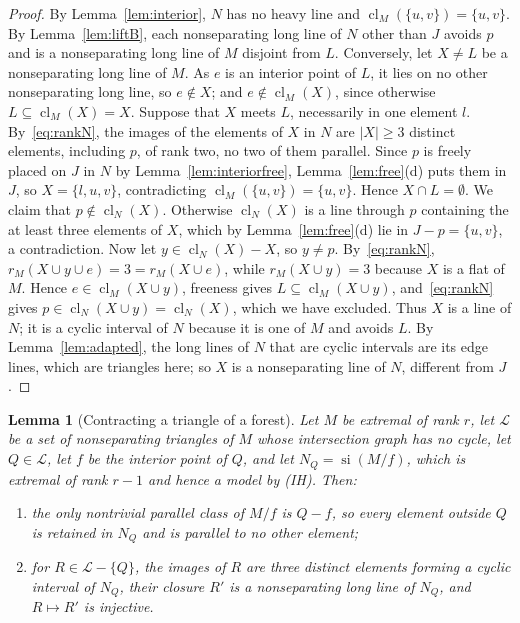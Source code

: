 \documentclass[11pt]{amsart}
\newtheorem{lemma}[theorem]{Lemma}
\theoremstyle{definition}
\theoremstyle{remark}
\numberwithin{equation}{section}
\newcommand{\cl}{\operatorname{cl}}
\newcommand{\si}{\operatorname{si}}
\begin{document}
\begin{proof}
By Lemma~\ref{lem:interior}, $N$ has no heavy line and $\cl_M(\{u,v\})=\{u,v\}$. By Lemma~\ref{lem:liftB}, each nonseparating long line of $N$ other than $J$ avoids $p$ and is a nonseparating long line of $M$ disjoint from $L$. Conversely, let $X\ne L$ be a nonseparating long line of $M$. As $e$ is an interior point of $L$, it lies on no other nonseparating long line, so $e\notin X$; and $e\notin\cl_M(X)$, since otherwise $L\subseteq\cl_M(X)=X$. Suppose that $X$ meets $L$, necessarily in one element $l$. By~\eqref{eq:rankN}, the images of the elements of $X$ in $N$ are $|X|\ge3$ distinct elements, including $p$, of rank two, no two of them parallel. Since $p$ is freely placed on $J$ in $N$ by Lemma~\ref{lem:interiorfree}, Lemma~\ref{lem:free}(d) puts them in $J$, so $X=\{l,u,v\}$, contradicting $\cl_M(\{u,v\})=\{u,v\}$. Hence $X\cap L=\emptyset$. We claim that $p\notin\cl_N(X)$. Otherwise $\cl_N(X)$ is a line through $p$ containing the at least three elements of $X$, which by Lemma~\ref{lem:free}(d) lie in $J-p=\{u,v\}$, a contradiction. Now let $y\in\cl_N(X)-X$, so $y\ne p$. By~\eqref{eq:rankN}, $r_M(X\cup y\cup e)=3=r_M(X\cup e)$, while $r_M(X\cup y)=3$ because $X$ is a flat of $M$. Hence $e\in\cl_M(X\cup y)$, freeness gives $L\subseteq\cl_M(X\cup y)$, and~\eqref{eq:rankN} gives $p\in\cl_N(X\cup y)=\cl_N(X)$, which we have excluded. Thus $X$ is a line of $N$; it is a cyclic interval of $N$ because it is one of $M$ and avoids $L$. By Lemma~\ref{lem:adapted}, the long lines of $N$ that are cyclic intervals are its edge lines, which are triangles here; so $X$ is a nonseparating line of $N$, different from $J$.
\end{proof}

\begin{lemma}[Contracting a triangle of a forest]\label{lem:persist}
Let $M$ be extremal of rank $r$, let $\mathcal L$ be a set of nonseparating triangles of $M$ whose intersection graph has no cycle, let $Q\in\mathcal L$, let $f$ be the interior point of $Q$, and let $N_Q=\si(M/f)$, which is extremal of rank $r-1$ and hence a model by \textup{(IH)}. Then:
\begin{enumerate}[label=\textup{(\alph*)}]
\item the only nontrivial parallel class of $M/f$ is $Q-f$, so every element outside $Q$ is retained in $N_Q$ and is parallel to no other element;
\item for $R\in\mathcal L-\{Q\}$, the images of $R$ are three distinct elements forming a cyclic interval of $N_Q$, their closure $R'$ is a nonseparating long line of $N_Q$, and $R\mapsto R'$ is injective.
\end{enumerate}
\end{lemma}
\end{document}
